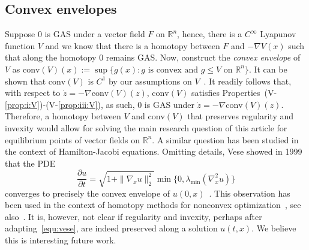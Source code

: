 \documentclass[letterpaper, 10 pt, conference]{ieeeconf}  %
\theoremstyle{mystyle}
\begin{document}
{
\subsection{Convex envelopes}
Suppose $0$ is GAS under a vector field $F$ on $\mathbb{R}^n$, hence, there is a $C^{\infty}$ Lyapunov function $V$ and we know that there is a homotopy between $F$ and $-\nabla V(x)$ such that along the homotopy $0$ remains GAS. Now, construct the \textit{convex envelope} of $V$ as $\mathrm{conv}({V})(x):=\sup\{g(x):g\text{ is convex and }g\leq V \text{ on }\mathbb{R}^n\}$. It can be shown that $\mathrm{conv}(V)$ is $C^1$ by our assumptions on $V$~\cite{ref:kirchheim2001differentiability}. It readily follows that, {with respect to $\dot{z}=-\nabla \mathrm{conv}(V)(z)$,} $\mathrm{conv}(V)$ satisfies Properties~(V-\ref{prop:i:V})-(V-\ref{prop:iii:V}), as such, $0$ is GAS under $\dot{z}=-\nabla \mathrm{conv}(V)(z)$. Therefore, a homotopy between $V$ and $\mathrm{conv}(V)$ that preserves regularity and invexity would allow for solving the main research question of this article for equilibrium points of vector fields on $\mathbb{R}^n$. A similar question has been studied in the context of Hamilton-Jacobi equations. Omitting details, Vese showed in 1999 that the PDE
\begin{equation}
\label{equ:vese}
    \frac{\partial u}{\partial t} = \sqrt{1+\|\nabla_x u\|_2^2 }\min \{0, \lambda_{\mathrm{min}}(\nabla_x^2 u)\}
\end{equation}
converges to precisely the convex envelope of $u(0,x)$~\cite{vese1999method}. This observation has been used in the context of homotopy methods for nonconvex optimization~\cite{mobahi2015link}, see also~\cite{simoes2021lasry,heaton2023global}. It is, however, not clear if regularity and invexity, perhaps after adapting~\eqref{equ:vese}, are indeed preserved along a solution $u(t,x)$. We believe this is interesting future work.  
}
\end{document}
